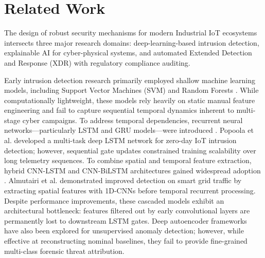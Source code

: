 \documentclass[11pt,a4paper]{article}
\begin{document}
\section{Related Work}
\label{sec:related_work}

The design of robust security mechanisms for modern Industrial IoT ecosystems intersects three major research domains: deep-learning-based intrusion detection, explainable AI for cyber-physical systems, and automated Extended Detection and Response (XDR) with regulatory compliance auditing.

Early intrusion detection research primarily employed shallow machine learning models, including Support Vector Machines (SVM) and Random Forests \cite{shone2018deep_ids, al2021securing_smart_cities}. While computationally lightweight, these models rely heavily on static manual feature engineering and fail to capture sequential temporal dynamics inherent to multi-stage cyber campaigns. To address temporal dependencies, recurrent neural networks—particularly LSTM and GRU models—were introduced \cite{popoola2021deep_ids}. Popoola et al. \cite{popoola2021deep_ids} developed a multi-task deep LSTM network for zero-day IoT intrusion detection; however, sequential gate updates constrained training scalability over long telemetry sequences. To combine spatial and temporal feature extraction, hybrid CNN-LSTM and CNN-BiLSTM architectures gained widespread adoption \cite{almutairi2024hybrid_bilstm}. Almutairi et al. \cite{almutairi2024hybrid_bilstm} demonstrated improved detection on smart grid traffic by extracting spatial features with 1D-CNNs before temporal recurrent processing. Despite performance improvements, these cascaded models exhibit an architectural bottleneck: features filtered out by early convolutional layers are permanently lost to downstream LSTM gates. Deep autoencoder frameworks \cite{ferrag2022edge_ids} have also been explored for unsupervised anomaly detection; however, while effective at reconstructing nominal baselines, they fail to provide fine-grained multi-class forensic threat attribution.
\end{document}
